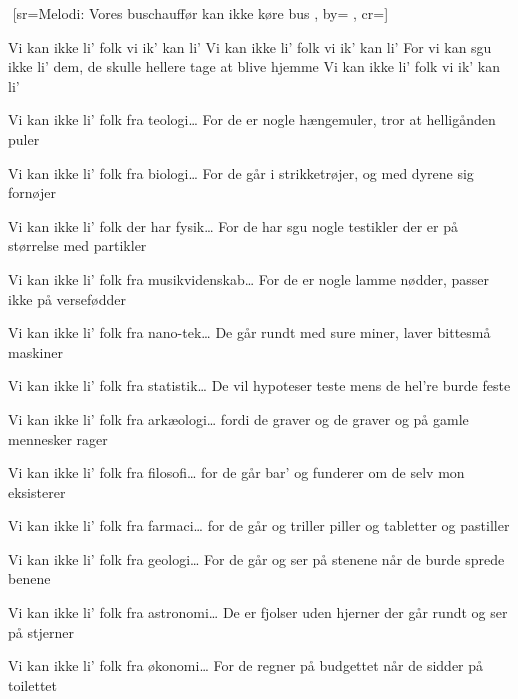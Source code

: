\documentclass[pdftex,12pt]{article}
\begin{document}
\begin{songs}{}
\setcounter{songnum}{0}

﻿%
[sr={Melodi: Vores buschauffør kan ikke køre bus}
,
by={}
,
cr={}]\hypertarget{Vi kan ikke li'}{}
\label{song0}

\beginverse
Vi kan ikke li' folk vi ik' kan li'
Vi kan ikke li' folk vi ik' kan li'
For vi kan sgu ikke li' dem,
de skulle hellere tage at blive hjemme
Vi kan ikke li' folk vi ik' kan li'

\endverse
\beginverse
Vi kan ikke li' folk fra teologi\ldots
For de er nogle hængemuler,
tror at helligånden puler

\endverse
\beginverse
Vi kan ikke li' folk fra biologi\ldots
For de går i strikketrøjer,
og med dyrene sig fornøjer

\endverse
\beginverse
Vi kan ikke li' folk der har fysik\ldots
For de har sgu nogle testikler
der er på størrelse med partikler

\endverse
\beginverse
Vi kan ikke li' folk fra musikvidenskab\ldots
For de er nogle lamme nødder,
passer ikke på versefødder

\endverse
\beginverse
Vi kan ikke li' folk fra nano-tek\ldots
De går rundt med sure miner,
laver bittesmå maskiner

\endverse
\beginverse
Vi kan ikke li' folk fra statistik\ldots
De vil hypoteser teste
mens de hel're burde feste

\endverse
\beginverse
Vi kan ikke li' folk fra arkæologi\ldots
fordi de graver og de graver
og på gamle mennesker rager

\endverse
\beginverse
Vi kan ikke li' folk fra filosofi\ldots
for de går bar' og funderer
om de selv mon eksisterer

\endverse
\beginverse
Vi kan ikke li' folk fra farmaci\ldots
for de går og triller piller
og tabletter og pastiller

\endverse
\beginverse
Vi kan ikke li' folk fra geologi\ldots
For de går og ser på stenene
når de burde sprede benene

\endverse
\beginverse
Vi kan ikke li' folk fra astronomi\ldots
De er fjolser uden hjerner
der går rundt og ser på stjerner

\endverse

\beginverse
Vi kan ikke li' folk fra økonomi\ldots
For de regner på budgettet
når de sidder på toilettet


\end{songs}
\end{document}
